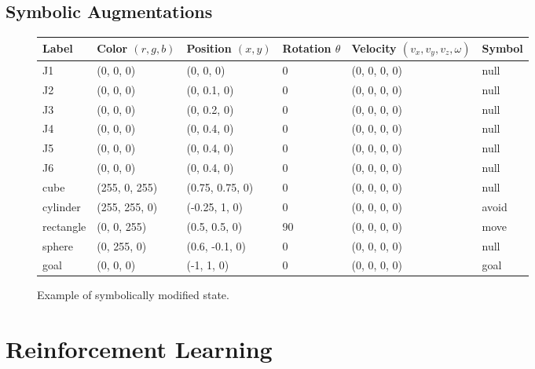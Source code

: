 \subsection{Symbolic Augmentations}
\begin{figure}
	\begin{tiny}
		\begin{center}
			\begin{tabular}{ | m{1cm} | m{1.75cm}| m{2cm} | m{1.5cm} | m{3cm} | m{1cm} | }
				\hline
				\textbf{Label} & \textbf{Color $(r, g, b)$} & \textbf{Position $(x,y)$} & \textbf{Rotation $\theta$} & \textbf{Velocity $(v_x, v_y, v_z, \omega)$} & \textbf{Symbol} \\
				\hline
				J1 & (0, 0, 0) & (0, 0, 0) & 0\textdegree & (0, 0, 0, 0) & null \\ 
				\hline
				J2 & (0, 0, 0) & (0, 0.1, 0) & 0\textdegree & (0, 0, 0, 0) & null\\ 
				\hline
				J3 & (0, 0, 0) & (0, 0.2, 0) & 0\textdegree & (0, 0, 0, 0) & null\\ 
				\hline
				J4 & (0, 0, 0) & (0, 0.4, 0) & 0\textdegree & (0, 0, 0, 0) & null\\ 
				\hline
				J5 & (0, 0, 0) & (0, 0.4, 0) & 0\textdegree & (0, 0, 0, 0) & null \\ 
				\hline
				J6 & (0, 0, 0) & (0, 0.4, 0) & 0\textdegree & (0, 0, 0, 0)& null \\ 
				\hline
				cube & (255, 0, 255) & (0.75, 0.75, 0) & 0\textdegree & (0, 0, 0, 0) & null\\ 
				\hline
				cylinder & (255, 255, 0) & (-0.25, 1, 0) & 0\textdegree & (0, 0, 0, 0) & avoid\\ 
				\hline
				rectangle & (0, 0, 255) & (0.5, 0.5, 0) & 90\textdegree & (0, 0, 0, 0) & move\\ 
				\hline
				sphere & (0, 255, 0) & (0.6, -0.1, 0) & 0\textdegree & (0, 0, 0, 0) & null\\ 
				\hline
				goal & (0, 0, 0) & (-1, 1, 0) & 0\textdegree & (0, 0, 0, 0) & goal\\ 
				\hline
			\end{tabular}
		\end{center}
	\end{tiny}
	\caption{Example of symbolically modified state.}
	\label{fig:symbolic_state}
\end{figure}





\section{Reinforcement Learning}
